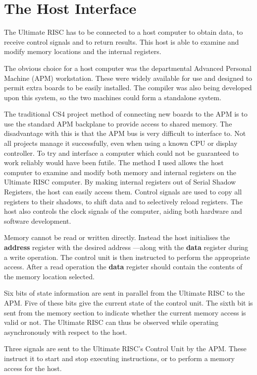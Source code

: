 \chapter{The Host Interface}

The Ultimate RISC has to be connected to a host computer to obtain 
 data, to receive control signals and to return 
results. This host is able to examine and modify memory 
locations and the internal registers.

The obvious choice for a host computer was the departmental Advanced Personal Machine (APM) workstation.
These were widely available for use and designed to permit extra boards to be easily installed.
The compiler was also being developed upon this system, so the two machines could form a standalone system.


The traditional CS4 project method of connecting new boards to the APM
is to use the standard APM backplane to provide access to shared
memory. The disadvantage with this is that the APM 
bus is very difficult to interface to.
Not all projects manage it 
successfully, even when using a known CPU or display controller. 
 To try and interface a computer which could not be guaranteed to work reliably would have been futile.
The method I  used  allows the host 
computer to examine and modify both memory and internal 
registers on the Ultimate RISC computer. 
By making  internal registers out of Serial Shadow Registers,
 the host  can easily access them. 
Control 
signals are used to copy all registers to their shadows, to 
shift data and to selectively reload registers.
The host  also controls the clock signals of the computer, aiding  both
hardware and software development.

 Memory cannot be read or written directly. Instead the host 
 initialises the {\bf address} register with the desired address ---along with  the {\bf data} register during a write operation. 
 The control unit is then  instructed
to perform the appropriate access. 
After a read operation the {\bf data} register
should contain the contents of the memory location selected.

Six bits of  state information are sent in parallel from the Ultimate RISC to the APM.
Five of these bits give the current state of the control unit. 
The sixth bit is sent from the memory section to indicate whether the current memory access is valid or not.
The Ultimate RISC can thus be observed while operating asynchronously with respect to the host.

Three signals are sent to the Ultimate RISC's Control Unit by the APM.
These  instruct it to start and stop executing instructions, or to perform a memory access for the host.


